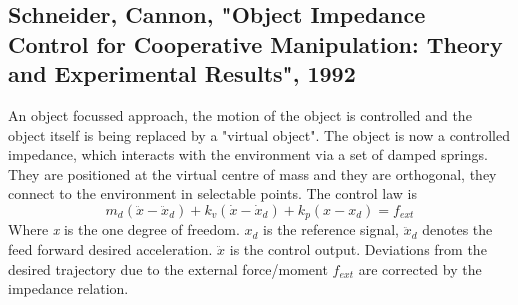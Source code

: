 \documentclass[conference]{IEEEtran}
\begin{document}
\subsection{Schneider, Cannon, "Object Impedance Control for Cooperative Manipulation: Theory and Experimental Results", 1992}

An object focussed approach, the motion of the object is controlled and the object itself is being replaced by a "virtual object". The object is now a controlled impedance, which interacts with the environment via a set of damped springs. They are positioned at the virtual centre of mass and they are orthogonal, they connect to the environment in selectable points. The control law is
\begin{equation}
m_d(\ddot{x}-\ddot{x}_d) + k_v(\dot{x}-\dot{x}_d) + k_p(x-x_d) = f_{ext}
\end{equation}
Where \textit{x} is the one degree of freedom. \textit{$ x_d $} is the reference signal, $ \ddot{x}_d $ denotes the feed forward desired acceleration. $ \ddot{x} $ is the control output. Deviations from the desired trajectory due to the external force/moment $ f_{ext} $ are corrected by the impedance relation.
\end{document}
